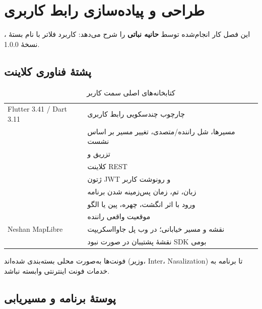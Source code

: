 \chapter[پیاده‌سازی رابط کاربری]{طراحی و پیاده‌سازی رابط کاربری}

این فصل کار انجام‌شده توسط \textbf{حانیه نباتی} را شرح می‌دهد: کاربرد فلاتر با نام بستهٔ ، نسخهٔ \textenglish{1.0.0}.

\section{پشتهٔ فناوری کلاینت}

\begin{table}[ht]
\centering
\caption{کتابخانه‌های اصلی سمت کاربر}
\label{tab:fe-stack}
\begin{tabularx}{\textwidth}{@{}>{\raggedleft\arraybackslash}p{} Y@{}}
\toprule
{} &  \\
\midrule
\textenglish{Flutter 3.41 / Dart 3.11} & چارچوب چندسکویی رابط کاربری \\
 & مسیرها، شل راننده/متصدی، تغییر مسیر بر اساس نشست \\
 & تزریق  و  \\
 & کلاینت \textenglish{REST} \\
 & ژتون \textenglish{JWT} و رونوشت کاربر \\
 & زبان، تم، زمان پس‌زمینه شدن برنامه \\
 & ورود با اثر انگشت، چهره، پین یا الگو \\
 & موقعیت واقعی راننده \\
\textenglish{Neshan MapLibre} & نقشه و مسیر خیابانی؛ در وب پل جاوااسکریپت \\
 & نقشهٔ پشتیبان در صورت نبود \textenglish{SDK} بومی \\
\bottomrule
\end{tabularx}
\end{table}

فونت‌ها به‌صورت محلی بسته‌بندی شده‌اند (وزیر، \textenglish{Inter}، \textenglish{Nasalization}) تا برنامه به خدمات فونت اینترنتی وابسته نباشد.

\section{پوستهٔ برنامه و مسیریابی}

